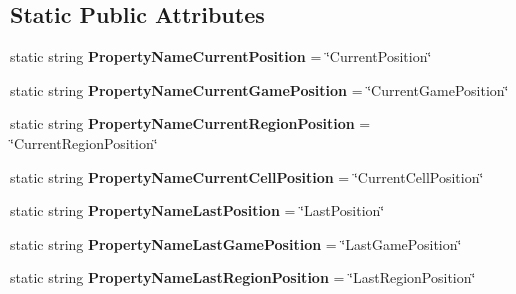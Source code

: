 \subsection*{Static Public Attributes}
\begin{DoxyCompactItemize}
\item 
\hypertarget{classClient_1_1Common_1_1Models_1_1Geolocation_a3f4999c40384dacf2bfbcc8541ec9d36}{static string {\bfseries Property\-Name\-Current\-Position} = \char`\"{}Current\-Position\char`\"{}}\label{classClient_1_1Common_1_1Models_1_1Geolocation_a3f4999c40384dacf2bfbcc8541ec9d36}

\item 
\hypertarget{classClient_1_1Common_1_1Models_1_1Geolocation_a7b6f72dc9388e33dc973df7b181ce411}{static string {\bfseries Property\-Name\-Current\-Game\-Position} = \char`\"{}Current\-Game\-Position\char`\"{}}\label{classClient_1_1Common_1_1Models_1_1Geolocation_a7b6f72dc9388e33dc973df7b181ce411}

\item 
\hypertarget{classClient_1_1Common_1_1Models_1_1Geolocation_a5353dece1f4b5136523b203c286fd286}{static string {\bfseries Property\-Name\-Current\-Region\-Position} = \char`\"{}Current\-Region\-Position\char`\"{}}\label{classClient_1_1Common_1_1Models_1_1Geolocation_a5353dece1f4b5136523b203c286fd286}

\item 
\hypertarget{classClient_1_1Common_1_1Models_1_1Geolocation_ada75530b4ed8ed2325645a2e36347638}{static string {\bfseries Property\-Name\-Current\-Cell\-Position} = \char`\"{}Current\-Cell\-Position\char`\"{}}\label{classClient_1_1Common_1_1Models_1_1Geolocation_ada75530b4ed8ed2325645a2e36347638}

\item 
\hypertarget{classClient_1_1Common_1_1Models_1_1Geolocation_a798075f80d9cd9bdb31ed9b63702640e}{static string {\bfseries Property\-Name\-Last\-Position} = \char`\"{}Last\-Position\char`\"{}}\label{classClient_1_1Common_1_1Models_1_1Geolocation_a798075f80d9cd9bdb31ed9b63702640e}

\item 
\hypertarget{classClient_1_1Common_1_1Models_1_1Geolocation_abe0697da656646d1f68449e24b85f7ff}{static string {\bfseries Property\-Name\-Last\-Game\-Position} = \char`\"{}Last\-Game\-Position\char`\"{}}\label{classClient_1_1Common_1_1Models_1_1Geolocation_abe0697da656646d1f68449e24b85f7ff}

\item 
\hypertarget{classClient_1_1Common_1_1Models_1_1Geolocation_ab9677c60c06fcf4dfe858b173b77eabe}{static string {\bfseries Property\-Name\-Last\-Region\-Position} = \char`\"{}Last\-Region\-Position\char`\"{}}\label{classClient_1_1Common_1_1Models_1_1Geolocation_ab9677c60c06fcf4dfe858b173b77eabe}


\end{DoxyCompactItemize}
